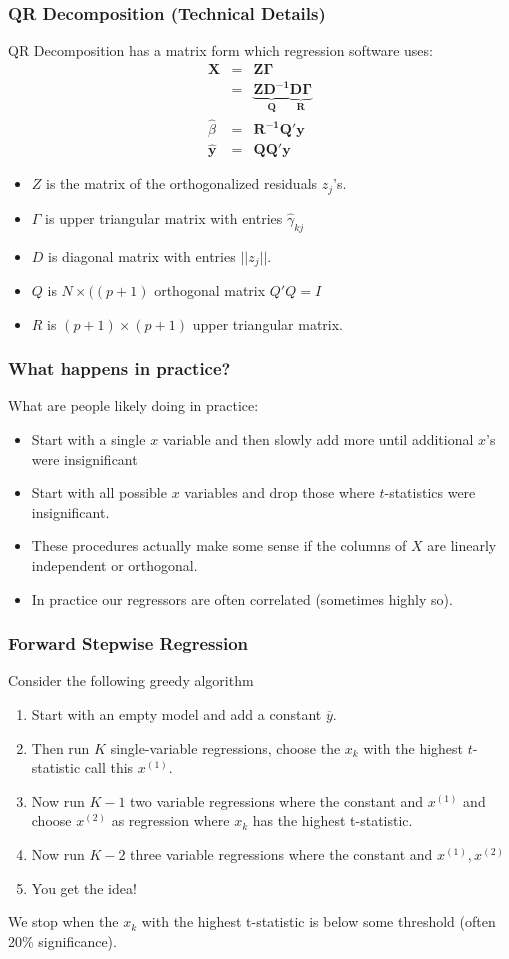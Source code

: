 \documentclass[xcolor=pdftex,dvipsnames,table,mathserif,aspectratio=169]{beamer}
\begin{document}
\begin{frame}
\frametitle{QR Decomposition (Technical Details)}
\small
QR Decomposition has a matrix form which regression software uses:
\begin{eqnarray*}
\mathbf{X} &=& \mathbf{Z \Gamma} \\
    &=& \mathbf{\underbrace{Z D^{-1}}_{Q} \underbrace{D \Gamma}_{R}} \\
    \hat{\beta} &=& \mathbf{R^{-1} Q' y}\\
    \hat{\mathbf{y}} &=& \mathbf{Q Q'} \mathbf{y}
\end{eqnarray*}
\vspace{-0.5cm}
\begin{itemize}
\item $Z$ is the matrix of the orthogonalized residuals $z_j$'s.
\item $\Gamma$ is upper triangular matrix with entries $\hat{\gamma}_{kj}$
\item $D$ is diagonal matrix with entries $|| z_j ||$.
\item $Q$ is $N \times ((p+1)$ orthogonal  matrix $Q'Q = I$ 
\item $R$ is $(p+1) \times (p+1)$ upper triangular matrix.
\end{itemize}
\end{frame}


\begin{frame}
\frametitle{What happens in practice?}
What are people likely doing in practice:
\begin{itemize}
\item Start with a single $x$ variable and then slowly add more until additional $x$'s were insignificant
\item Start with all possible $x$ variables and drop those where $t$-statistics were insignificant.
\item These procedures actually make some sense if the columns of $X$ are \alert{linearly independent} or \alert{orthogonal}.
\item In practice our regressors are often correlated (sometimes highly so).
\end{itemize}
\end{frame}


\begin{frame}
\frametitle{Forward Stepwise Regression}
Consider the following \alert{greedy algorithm}
\begin{enumerate}
\item Start with an empty model and add a constant $\overline{y}$.
\item Then run $K$ single-variable regressions, choose the $x_k$ with the highest $t$-statistic call this $x^{(1)}$.
\item Now run $K-1$ two variable regressions where the constant and $x^{(1)}$ and choose $x^{(2)}$ as regression where $x_k$ has the highest t-statistic.
\item Now run $K-2$ three variable regressions where the constant and $x^{(1)},x^{(2)}$
\item You get the idea!
\end{enumerate}
We stop when the $x_k$ with the highest t-statistic is below some threshold (often 20\% significance).
\end{frame}
\end{document}
